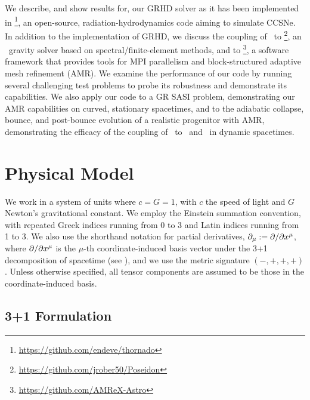 We describe, and show results for, our GRHD solver
as it has been implemented in \thornado%
\footnote{\url{https://github.com/endeve/thornado}},
an open-source, radiation-hydrodynamics code aiming to simulate CCSNe.
In addition to the implementation of GRHD, we discuss the coupling
of \thornado\ to \poseidon%
\footnote{\url{https://github.com/jrober50/Poseidon}},
an \xcfc\ gravity solver based on spectral/finite-element methods,
and to \amrex\footnote{\url{https://github.com/AMReX-Astro}},
a software framework that provides tools for MPI parallelism
and block-structured adaptive mesh refinement (AMR).
We examine the performance of our code by running several challenging test
problems to probe its robustness and demonstrate its capabilities.
We also apply our code to a GR SASI problem, demonstrating
our AMR capabilities on curved, stationary spacetimes,
and to the adiabatic collapse, bounce, and post-bounce evolution of a realistic
progenitor with AMR,
demonstrating the efficacy of the coupling of
\thornado\ to \poseidon\ and \amrex\ in dynamic spacetimes.

\section{Physical Model}

We work in a system of units where $c=G=1$,
with $c$ the speed of light and $G$ Newton's gravitational constant.
We employ the Einstein summation convention,
with repeated Greek indices running from
0 to 3 and Latin indices running from 1 to 3.
We also use the shorthand notation for partial derivatives,
$\partial_{\mu}:=\partial/\partial x^{\mu}$, where $\partial/\partial x^{\mu}$
is the $\mu$-th coordinate-induced basis vector under the 3+1 decomposition
of spacetime (see ),
and we use the metric signature $\left(-,+,+,+\right)$.
Unless otherwise specified, all tensor components are assumed to be those
in the coordinate-induced basis.

\subsection{3+1 Formulation}
\label{ss.3+1}


